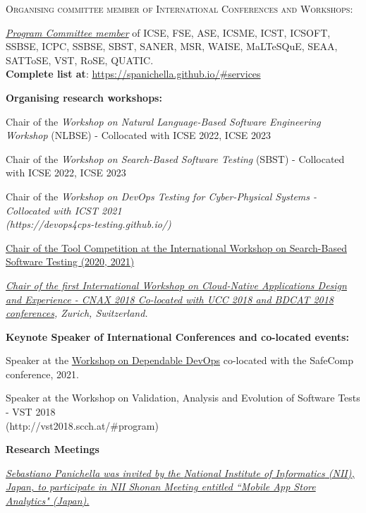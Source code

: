 \documentclass[11pt]{article}
\begin{document}
\medskip\medskip 
\textsc{Organising committee member of International Conferences and Workshops:}
\medskip 
\begin{innerlist}
 \item \href{https://spanichella.github.io/#services}{\textit{Program Committee member}} of ICSE, FSE, ASE, ICSME, ICST, ICSOFT, SSBSE, ICPC, SSBSE, SBST, SANER, MSR, WAISE, MaLTeSQuE, SEAA, SATToSE, VST, RoSE, QUATIC.  \\\textbf{Complete list at}: \href{https://spanichella.github.io/\#services}{https://spanichella.github.io/\#services}
 \end{innerlist}
\medskip 
\textbf{Organising research workshops:}
\begin{innerlist}
\item Chair of the \textit{Workshop on Natural Language-Based Software Engineering Workshop} (NLBSE) - Collocated with ICSE 2022, ICSE 2023
\item Chair of  the \textit{Workshop on Search-Based Software Testing} (SBST) - Collocated with ICSE 2022, ICSE 2023
\item Chair of the \textit{Workshop on DevOps Testing for Cyber-Physical Systems - Collocated with ICST 2021 \\(https://devops4cps-testing.github.io/)} 
\item \href{}
{Chair of the Tool Competition at the 
International Workshop on Search-Based Software Testing (2020, 2021)} 
       \item \emph{\href{http://cnax.servicelaboratory.ch/}
                   {\textit{Chair of the first International Workshop on Cloud-Native Applications Design and Experience - CNAX 2018
Co-located with UCC 2018 and BDCAT 2018 conferences}}, Zurich, Switzerland.}
\end{innerlist}
\medskip 
\textbf{Keynote Speaker of International Conferences and co-located events:}
\begin{innerlist}
\item Speaker at the \href{https://safecomp2021.hosted.york.ac.uk/wp-content/uploads/2021/08/DepDevOps_2021_programme.pdf}{Workshop on Dependable DevOps} co-located with the SafeComp conference, 2021.
\item Speaker at the Workshop on Validation, Analysis and Evolution of Software Tests - VST 2018  \\(http://vst2018.scch.at/\#program) 
\end{innerlist}
\medskip 
\textbf{Research Meetings}
\begin{innerlist}
   \item \emph{
              \href{http://www.nii.ac.jp/��}
                   {Sebastiano Panichella was invited by the \href{http://www.nii.ac.jp/}{National Institute of Informatics} (NII), Japan, to participate in \href{http://shonan.nii.ac.jp/shonan/}{NII Shonan Meeting entitled ``Mobile App Store Analytics"} (Japan).
}}


\end{innerlist}
\end{document}
